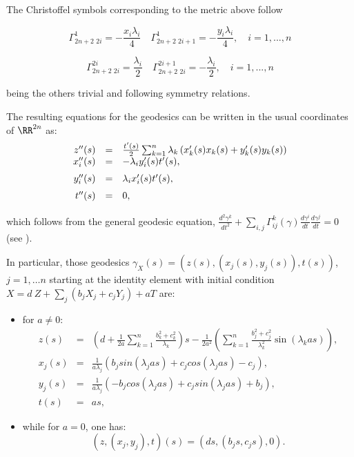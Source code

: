 \documentclass[12pt]{amsart}
\theoremstyle{plain}
\theoremstyle{definition}
\theoremstyle{remark}
\begin{document}
	The Christoffel symbols corresponding to the metric above follow
	
	\[ \Gamma^1_{2n+2 \,\, 2i}=-\frac{x_{i} \lambda_{i}}{4} \quad \Gamma^1_{2n+2 \,\, 2i+1}=-\frac{y_{i} \lambda_{i}}{4}, \quad i=1,..., n \]
	
	\[ \Gamma^{2i}_{2n+2 \,\, 2i}=\frac{\lambda_i}{2} \quad \Gamma^{2i+1}_{2n+2 \,\, 2i}=-\frac{\lambda_i}{2}, \quad i=1,..., n \]
	
	being the others trivial and following  symmetry relations. 
	
	The resulting equations for the geodesics can be written in the usual  coordinates of $\RR^{2n}$ as:
	\begin{equation}\label{geodcomp}
		\begin{array}{rcl}
			z''(s)&= & \frac{ t'(s)}{2}\sum_{k=1}^{n}  \lambda_k \left( x_k'(s) x_k(s)+y_k'(s) y_k(s) \right) \\ \vspace{.2cm}
			x_i''(s)&=&-\lambda_i y_i'(s) t'(s),\\ \vspace{.2cm}
			y_i''(s)&=&\lambda_i x_i'(s) t'(s),\\ \vspace{.2cm}
			t''(s)&=&0,
		\end{array}
	\end{equation}
		which follows from the general geodesic equation, $\frac{d^2 \gamma^k}{d t^2} + \sum_{i,j} \Gamma^k_{i j}(\gamma) \frac{d \gamma^i}{dt} \frac{d \gamma^j}{dt} = 0$ (see \cite{ON}).
	
	
	
	In particular, those geodesics $\gamma_X(s)=(z(s), (x_j(s),y_j(s)),t(s))$, $j=1, \hdots n$ starting at the identity element  with initial condition $X =  d \ Z + \sum_j (b_j X_j + c_j Y_j) + a T$ are:
	
	\begin{itemize}
		\item for $a \neq 0$:
			\begin{eqnarray} \label{geo_osc_1}
			z(s)&= & \left(d + \frac{1}{2 a} \sum_{k=1}^{n} \frac{ b_{k}^{2}+c_k^{2}}{\lambda_k}\right)s- \frac{1}{2 a^{2}} \left(  \sum_{k=1}^{n} \frac{b_{j}^{2}+c_j^2}{\lambda_k^{2}} \sin(\lambda_k a s) \right),\\
			x_j(s)&=&  \frac{1}{a \lambda_j} \left(   {b_j}sin(\lambda_j a s)+{c_j}cos(\lambda_j a s)-{c_j} \right),\\
			y_j(s)&=&  \frac{1}{a \lambda_j}  \left(    -{b_j}cos(\lambda_j a s)+{c_j} sin(\lambda_j a s)+{b_j} \right),\\ 
			t(s)&=&a s,
		\end{eqnarray}
		\item while for $a=0$, one has:
		\begin{equation}\label{geo2}
			(z,(x_j,y_j),t)(s)=(ds,(b_j s,c_j s),0). 
		\end{equation}
		
	\end{itemize}
	
\end{document}
